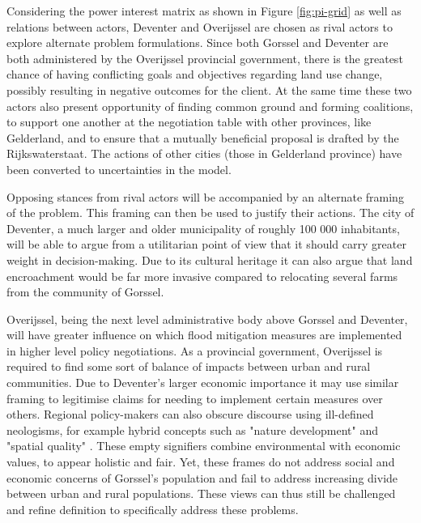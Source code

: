 \bigskip 
Considering the power interest matrix as shown in Figure \ref{fig:pi-grid} as well as relations between actors, Deventer and Overijssel are chosen as rival actors to explore alternate problem formulations. Since both Gorssel and Deventer are both administered by the Overijssel provincial government, there is the greatest chance of having conflicting goals and objectives regarding land use change, possibly resulting in negative outcomes for the client. At the same time these two actors also present opportunity of finding common ground and forming coalitions, to support one another at the negotiation table with other provinces, like Gelderland, and to ensure that a mutually beneficial proposal is drafted by the Rijkswaterstaat. The actions of other cities (those in Gelderland province) have been converted to uncertainties in the model.

\bigskip 

Opposing stances from rival actors will be accompanied by an alternate framing of the problem. This framing can then be used to justify their actions. The city of Deventer, a much larger and older municipality of roughly 100 000 inhabitants, will be able to argue from a utilitarian point of view that it should carry greater weight in decision-making. Due to its cultural heritage it can also argue that land encroachment would be far more invasive compared to relocating several farms from the community of Gorssel. 

Overijssel, being the next level administrative body above Gorssel and Deventer, will have greater influence on which flood mitigation measures are implemented in higher level policy negotiations. As a provincial government, Overijssel is required to find some sort of balance of impacts between urban and rural communities. Due to Deventer's larger economic importance it may use similar framing to legitimise claims for needing to implement certain measures over others. Regional policy-makers can also obscure discourse using ill-defined neologisms, for example hybrid concepts such as "nature development" and "spatial quality" \parencite{warner_implementing_2011}. These empty signifiers combine environmental with economic values, to appear holistic and fair. Yet, these frames do not address social and economic concerns of Gorssel's population and fail to address increasing divide between urban and rural populations. These views can thus still be challenged and refine definition to specifically address these problems.

